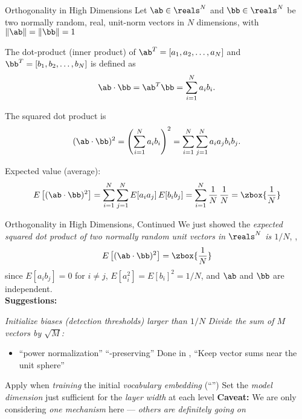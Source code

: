 
\begin{slide}[\slideopts,toc={Orthogonality}]{Orthogonality in High Dimensions}
\vspace{-1em}
% 
Let $\ab\in\reals^N$ and $\bb\in\reals^N$ be two normally random, real, unit-norm vectors in $N$ dimensions,
with $\|\ab\|=\|\bb\|=1$

\maybepause
The dot-product (inner product) of
$\ab^T=[a_1,a_2,\ldots,a_N]$ and
$\bb^T=[b_1,b_2,\ldots,b_N]$ is defined as
\[
\ab \cdot \bb = \ab^T\bb = \sum_{i=1}^{N} a_i b_i.
\]

\maybepause
The squared dot product is
\[
(\ab \cdot \bb)^2 = \left(\sum_{i=1}^{N} a_i b_i\right)^2 = \sum_{i=1}^{N} \sum_{j=1}^{N} a_i a_j b_i b_j.
\]

\maybepause
Expected value (average):
\[
E\left[(\ab \cdot \bb)^2\right]
= \sum_{i=1}^{N} \sum_{j=1}^{N} E[a_i a_j] \, E[b_i b_j]
= \sum_{i=1}^{N} \frac{1}{N}\,\frac{1}{N}
= \zbox{\frac{1}{N}}
\]
\end{slide}

\begin{slide}[\slideopts,toc={}]{Orthogonality in High Dimensions, Continued}
\vspace{-1em}
We just showed the \emph{expected squared dot product of two normally random unit vectors in $\reals^N$ is $1/N$}, \ie,
\[
E\left[(\ab \cdot \bb)^2\right] = \zbox{\frac{1}{N}}
\]
since $E[a_i b_j]=0$ for $i \ne j$, $E[a_i^2] = E[b_i]^2 = 1/N$, and $\ab$ and $\bb$ are independent.\\
\maybepause
\textbf{Suggestions:}
\begin{itemize}
\mpitem \emph{Initialize biases (detection thresholds) larger than $1/N$}
\mpitem \emph{Divide the sum of $M$ vectors by $\sqrt{M}$:}
\begin{itemize}
  \item ``power normalization''
  \mpitem ``-preserving''
  \mpitem Done in , \eg
  \mpitem ``Keep vector sums near the unit sphere''
\end{itemize}
\mpitem Apply  when \emph{training} the initial \emph{vocabulary embedding} (``'')
\mpitem Set the \emph{model dimension} just sufficient for the \emph{layer width} at each level
\mpitem \textbf{Caveat:} We are only considering \emph{one mechanism} here --- \emph{others are definitely going on}
\end{itemize}

\end{slide}

